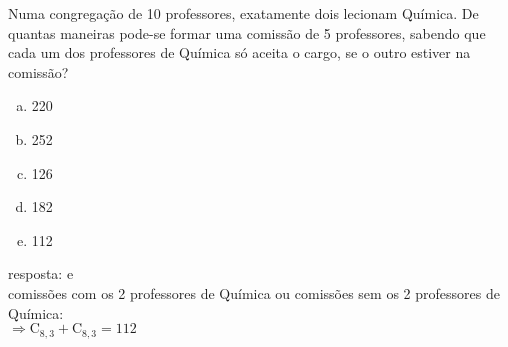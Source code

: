 \begin{ex}
 Numa congregação de 10 professores, exatamente dois lecionam Química. De quantas maneiras pode-se formar uma comissão de 5 professores, sabendo que cada um dos professores de Química só aceita o cargo, se o outro estiver na comissão?
    \begin{enumerate}[(a)]
    \item 220
    \item 252
    \item 126
    \item 182
    \item 112
    \end{enumerate}
      \begin{sol}
      resposta: e \\
      comissões com os 2 professores de Química ou comissões sem os 2 professores de Química: \\
      $\Longrightarrow \mathrm{C}_{8,3}+\mathrm{C}_{8,3}= 112$
      
      \end{sol}
\end{ex}